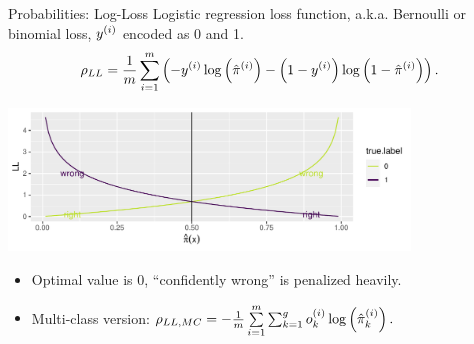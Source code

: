 
\begin{vbframe}{Probabilities: Log-Loss}
Logistic regression loss function, a.k.a. Bernoulli or binomial loss, $y^{(i)}$ 
encoded as 0 and 1.
$$\rho_{LL} = \frac{1}{m} \sum_{i = 1}^m \left( - y^{(i)} \log \left( 
\hat \pi^{(i)} \right) - \left( 1-y^{(i)} \right) \log \left( 1 - \hat \pi^{(i)} 
\right) \right).$$
\begin{knitrout}\scriptsize
{}\color{fgcolor}

{\centering \includegraphics[width=0.8\textwidth]{figure/eval_mclass_2}  

}

\end{knitrout}
\begin{itemize}
  \item Optimal value is 0, \enquote{confidently wrong} is penalized heavily.
  \item Multi-class version: $\rho_{LL, MC} = 
  - \frac{1}{m} \sum\limits_{i = 1}^m \sum_{k=1}^g o_k^{(i)} \log \left( 
  \hat \pi_k^{(i)} \right).$
\end{itemize}
\end{vbframe}


\endlecture

